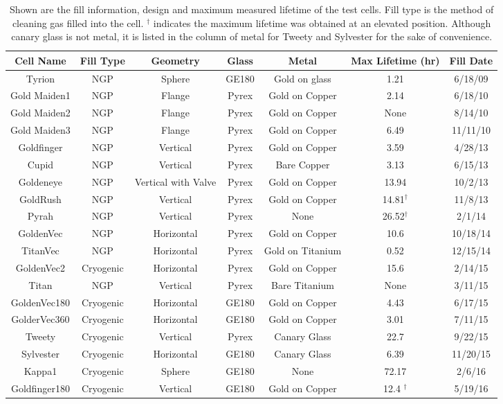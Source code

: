 \begin{table}\scriptsize
	\captionsetup{font=scriptsize}
	\begin{center}
		\def\arraystretch{0.75}
		\setlength\tabcolsep{2pt}
		\begin{tabular}{|c|c|c|c|c|c|c|}
			\hline
			Cell Name & Fill Type & Geometry & Glass & Metal & Max Lifetime (hr) & Fill Date\\ \hline
			Tyrion & NGP & Sphere & GE180 & Gold on glass & 1.21 & 6/18/09 \\ \hline
			Gold Maiden1 & NGP & Flange & Pyrex & Gold on Copper & 2.14 & 6/18/10 \\ \hline
			Gold Maiden2 & NGP & Flange & Pyrex & Gold on Copper & None & 8/14/10\\ \hline
			Gold Maiden3 & NGP & Flange & Pyrex & Gold on Copper & 6.49 & 11/11/10\\ \hline
			Goldfinger & NGP & Vertical & Pyrex & Gold on Copper & 3.59 & 4/28/13\\ \hline
			Cupid & NGP & Vertical & Pyrex & Bare Copper & 3.13 & 6/15/13\\ \hline
			Goldeneye & NGP & Vertical with Valve & Pyrex & Gold on Copper & 13.94 & 10/2/13\\ \hline
			GoldRush & NGP & Vertical & Pyrex & Gold on Copper & 14.81$^\dagger$  & 11/8/13\\ \hline
			Pyrah & NGP & Vertical & Pyrex & None & 26.52$^\dagger$ & 2/1/14\\ \hline
			GoldenVec & NGP & Horizontal & Pyrex & Gold on Copper & 10.6 & 10/18/14\\ \hline
			TitanVec & NGP & Horizontal & Pyrex & Gold on Titanium & 0.52 & 12/15/14\\ \hline
			GoldenVec2 & Cryogenic & Horizontal & Pyrex & Gold on Copper & 15.6 & 2/14/15\\ \hline
			Titan & NGP & Vertical & Pyrex & Bare Titanium & None & 3/11/15\\ \hline
			GoldenVec180 & Cryogenic & Horizontal & GE180 & Gold on Copper & 4.43 & 6/17/15\\ \hline
			GolderVec360 & Cryogenic & Horizontal & GE180 & Gold on Copper & 3.01 & 7/11/15\\ \hline
			Tweety & Cryogenic & Vertical & Pyrex & Canary Glass & 22.7 & 9/22/15 \\ \hline
			Sylvester & Cryogenic & Horizontal & GE180 & Canary Glass & 6.39 & 11/20/15\\ \hline
			Kappa1 & Cryogenic & Sphere & GE180 & None & 72.17 & 2/6/16\\ \hline
			Goldfinger180 & Cryogenic & Vertical & GE180 & Gold on Copper & 12.4 $^\dagger$ & 5/19/16\\ \hline
		\end{tabular}
		\caption
		{Shown are the fill information, design and maximum measured lifetime of the test cells. Fill type is the method of cleaning gas filled into the cell. $^\dagger$ indicates the maximum lifetime was obtained at an elevated position. Although canary glass is not metal, it is listed in the column of metal for Tweety and Sylvester for the sake of convenience.}
		\label{test_cells}
	\end{center}
\end{table}


